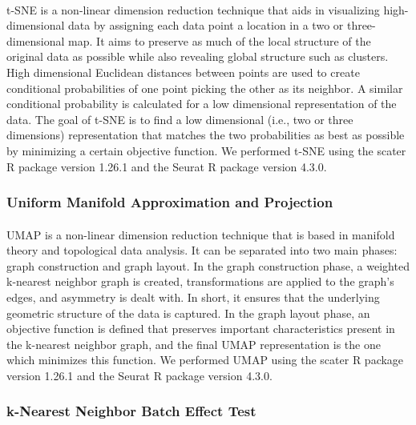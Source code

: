 \documentclass[
12pt, %
letterpaper, %
oneside, %
headinclude,footinclude, %
BCOR5mm, %
]{scrartcl}
\begin{document}
\paragraph*{}
t-SNE is a non-linear dimension reduction technique \citep{van2008visualizing} that aids in visualizing high-dimensional data by assigning each data point a location in a two or three-dimensional map. It aims to preserve as much of the local structure of the original data as possible while also revealing global structure such as clusters. High dimensional Euclidean distances between points are used to create conditional probabilities of one point picking the other as its neighbor. A similar conditional probability is calculated for a low dimensional representation of the data. The goal of t-SNE is to find a low dimensional (i.e., two or three dimensions) representation that matches the two probabilities as best as possible by minimizing a certain objective function. We performed t-SNE using the scater R package \citep{davis2017scater} version 1.26.1 and the Seurat R package \citep{stuart2019comprehensive} version 4.3.0.

\subsubsection*{Uniform Manifold Approximation and Projection}

\paragraph*{}
UMAP is a non-linear dimension reduction technique \citep{mcinnes2018umap} that is based in manifold theory and topological data analysis. It can be separated into two main phases: graph construction and graph layout. In the graph construction phase, a weighted k-nearest neighbor graph is created, transformations are applied to the graph's edges, and asymmetry is dealt with. In short, it ensures that the underlying geometric structure of the data is captured. In the graph layout phase, an objective function is defined that preserves important characteristics present in the k-nearest neighbor graph, and the final UMAP representation is the one which minimizes this function. We performed UMAP using the scater R package \citep{davis2017scater} version 1.26.1 and the Seurat R package \citep{stuart2019comprehensive} version 4.3.0.

\subsubsection*{k-Nearest Neighbor Batch Effect Test}
\end{document}
